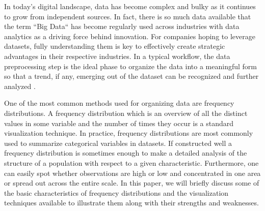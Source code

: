 
In today's digital landscape, data has become complex and bulky as it continues to 
grow from independent sources. In fact, there is so much data available that the 
term ``Big Data`` has become regularly used across industries with data analytics as a 
driving force behind innovation. For companies hoping to leverage datasets, fully
understanding them is key to effectively create strategic advantages in their respective 
industries. In a typical workflow, the data preprocessing step is the ideal phase 
to organize the data into a meaningful form so that a trend, if any, emerging 
out of the dataset can be recognized and further analyzed \cite{c10}. 

One of the most common methods used for organizing data are frequency distributions.
A frequency distribution which is an overview of all the distinct values in some 
variable and the number of times they occur is a standard visualization technique. 
In practice, frequency distributions are most commonly used to summarize categorical 
variables in datasets. If constructed well a frequency distribution is sometimes 
enough to make a detailed analysis of the structure of a population with respect 
to a given characteristic. Furthermore, one can easily spot whether observations 
are high or low and concentrated in one area or spread out across the entire scale. 
In this paper, we will briefly discuss some of the basic characteristics of 
frequency distributions and the visualization techniques available to 
illustrate them along with their strengths and weaknesses.
